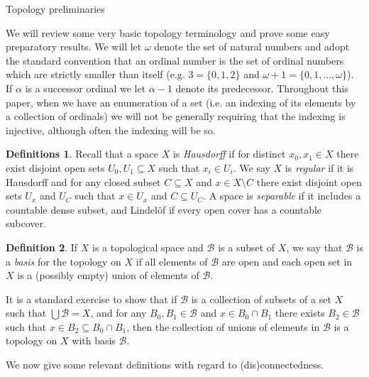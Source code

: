 \documentclass{amsart}
\theoremstyle{definition}\newtheorem{theorem}{Theorem}
\theoremstyle{definition}\newtheorem{bigtheorem}{Theorem}
\numberwithin{theorem}{section}
\theoremstyle{definition}\newtheorem{corollary}[theorem]{Corollary}
\theoremstyle{definition}\newtheorem{proposition}[theorem]{Proposition}
\theoremstyle{definition}\newtheorem{definition}[theorem]{Definition}
\theoremstyle{definition}\newtheorem{question}[theorem]{Question}
\theoremstyle{definition}\newtheorem{example}[theorem]{Example}
\theoremstyle{definition}\newtheorem{remark}[theorem]{Remark}
\theoremstyle{definition}\newtheorem{note}[theorem]{Note}
\theoremstyle{definition}\newtheorem{lemma}[theorem]{Lemma}
\theoremstyle{definition}\newtheorem{fact}[theorem]{Fact}
\theoremstyle{definition}\newtheorem{define}[theorem]{Definition}
\theoremstyle{definition}\newtheorem{definitions}[theorem]{Definitions}
\theoremstyle{definition}\newtheorem{claim}[theorem]{Claim}
\theoremstyle{definition}\newtheorem{obs}[theorem]{Observation}
\theoremstyle{definition}\newtheorem{construction}[theorem]{Construction}
\newcommand{\Bo}{\mathcal{B}}
\begin{document}
\begin{section}{Topology preliminaries}\label{Top}

We will review some very basic topology terminology and prove some easy preparatory results.  We will let $\omega$ denote the set of natural numbers and adopt the standard convention that an ordinal number is the set of ordinal numbers which are strictly smaller than itself (e.g. $3 = \{0, 1, 2\}$ and $\omega + 1 = \{0, 1, \ldots, \omega\}$).  If $\alpha$ is a successor ordinal we let $\alpha - 1$ denote its predecessor.  Throughout this paper, when we have an enumeration of a set (i.e. an indexing of its elements by a collection of ordinals) we will not be generally requiring that the indexing is injective, although often the indexing will be so.

\begin{definitions}  Recall that a space $X$ is \emph{Hausdorff} if for distinct $x_0, x_1 \in X$ there exist disjoint open sets $U_0, U_1\subseteq X$ such that $x_i \in U_i$.  We say $X$ is \emph{regular} if it is Hausdorff and for any closed subset $C \subseteq X$ and $x\in X \setminus C$ there exist disjoint open sets $U_x$ and $U_C$ such that $x\in U_x$ and $C \subseteq U_C$.  A space is \emph{separable} if it includes a countable dense subset, and Lindel\"of if every open cover has a countable subcover.
\end{definitions}

\begin{definition}  If $X$ is a topological space and $\mathcal{B}$ is a subset of $X$, we say that $\mathcal{B}$ is a \emph{basis} for the topology on $X$ if all elements of $\Bo$ are open and each open set in $X$ is a (possibly empty) union of elements of $\mathcal{B}$.
\end{definition}

It is a standard exercise to show that if $\mathcal{B}$ is a collection of subsets of a set $X$ such that $\bigcup \mathcal{B} = X$, and for any $B_0, B_1 \in \mathcal{B}$ and $x\in B_0 \cap B_1$ there exists $B_2 \in \mathcal{B}$ such that $x\in B_2 \subseteq B_0 \cap B_1$, then the collection of unions of elements in $\mathcal{B}$ is a topology on $X$ with basis $\mathcal{B}$.

We now give some relevant definitions with regard to (dis)connectedness.


\end{section}
\end{document}
